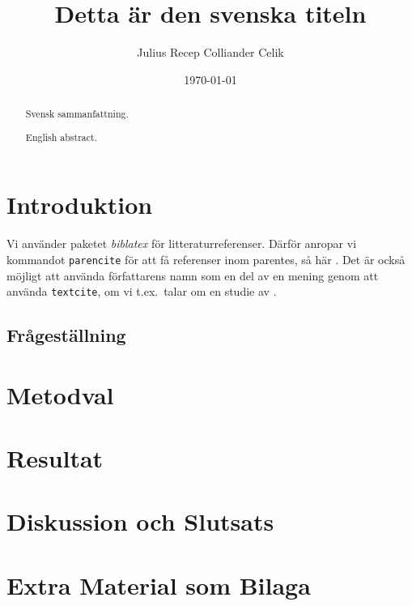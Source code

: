 \documentclass[swedish]{kththesis}
\title{Detta är den svenska titeln}
\author{Julius Recep Colliander Celik}
\date{\today}
\begin{document}
\frontmatter

\titlepage

\begin{abstract}
  Svensk sammanfattning.

  \blindtext
\end{abstract}


\begin{otherlanguage}{english}
  \begin{abstract}
    English abstract.

    \blindtext
  \end{abstract}
\end{otherlanguage}


\tableofcontents


\mainmatter


\chapter{Introduktion}

Vi använder paketet \emph{biblatex} för litteraturreferenser.  Därför
anropar vi kommandot \texttt{parencite} för att få referenser inom
parentes, så här \parencite{heisenberg2015}.  Det är också möjligt
att använda författarens namn som en del av en mening genom att
använda \texttt{textcite}, om vi t.ex.\ talar om en studie av
\textcite{einstein2016}.

\Blindtext

\section{Frågeställning}

\blindtext

\chapter{Metodval}

\blindtext

\chapter{Resultat}

\chapter{Diskussion och Slutsats}

\printbibliography[heading=bibintoc] %

\appendix

\chapter{Extra Material som Bilaga}
\end{document}
